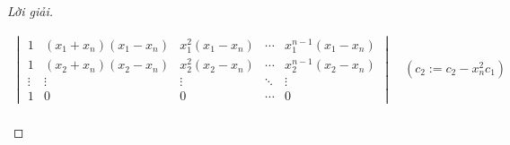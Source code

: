 \begin{proof}[Lời giải]
\begin{enumerate}[label = (\alph*)]
\begin{align*}
\begin{vmatrix}
                      1      & (x_{1} + x_{n})(x_{1} - x_{n}) & x_{1}^{2}(x_{1} - x_{n}) & \cdots & x_{1}^{n-1}(x_{1} - x_{n}) \\
                      1      & (x_{2} + x_{n})(x_{2} - x_{n}) & x_{2}^{2}(x_{2} - x_{n}) & \cdots & x_{2}^{n-1}(x_{2} - x_{n}) \\
                      \vdots & \vdots                         & \vdots                   & \ddots & \vdots                     \\
                      1      & 0                              & 0                        & \cdots & 0
                  \end{vmatrix}\quad(c_{2}:=c_{2} - x_{n}^{2}c_{1}) \\
              \end{align*}
              

\end{enumerate}
\end{proof}
